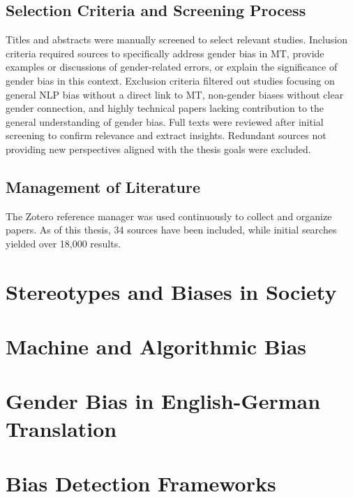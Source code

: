 \subsection{Selection Criteria and Screening Process}
Titles and abstracts were manually screened to select relevant studies. Inclusion criteria required sources to specifically address gender bias in MT, provide examples or discussions of gender-related errors, or explain the significance of gender bias in this context. Exclusion criteria filtered out studies focusing on general NLP bias without a direct link to MT, non-gender biases without clear gender connection, and highly technical papers lacking contribution to the general understanding of gender bias. Full texts were reviewed after initial screening to confirm relevance and extract insights. Redundant sources not providing new perspectives aligned with the thesis goals were excluded.

\subsection{Management of Literature}
The Zotero reference manager was used continuously to collect and organize papers. As of this thesis, 34 sources have been included, while initial searches yielded over 18,000 results.

\section{Stereotypes and Biases in Society}
\section{Machine and Algorithmic Bias}
\section{Gender Bias in English-German Translation}
\section{Bias Detection Frameworks}




    
    

